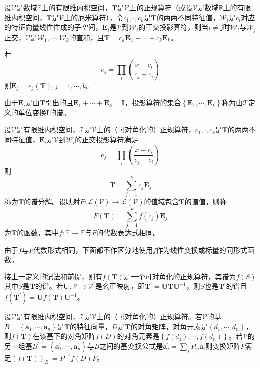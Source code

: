 \documentclass[main.tex]{subfiles}
\begin{document}
\begin{theorem}
设$\mathcal{V}$是数域$\mathbb{F}$上的有限维内积空间，$\mathbf{T}$是$\mathcal{V}$上的正规算符（或设$\mathcal{V}$是数域$\mathbb{R}$上的有限维内积空间，$\mathbf{T}$是$\mathcal{V}$上的厄米算符），令$c_1,\cdot,c_k$是$\mathbf{T}$的两两不同特征值，$\mathcal{W}_i$是$c_i$对应的特征向量线性性成的子空间，$\mathbf{E}_i$是$\mathcal{V}$到$\mathcal{W}_i$的正交投影算符，则当$i\neq j$时$\mathcal{W}_i$与$\mathcal{W}_j$正交，$\mathcal{V}$是$\mathcal{W}_1,\cdots,\mathcal{W}_k$的直和，且$\mathbf{T}=c_a\mathbf{E}_1+\cdots+c_k\mathbf{E}_k$。
\end{theorem}

\begin{corollary}
若
\[
e_j=\prod_i\left(\frac{x-c_i}{c_j-c_i}\right)\]
则$\mathbf{E}_j=e_j\left(\mathbf{T}\right),j=1,\cdots,k$。
\end{corollary}

由于$\mathbf{E}_i$是由$\mathbf{T}$引出的且$\mathbf{E}_1+\cdots+\mathbf{E}_k=\mathbf{I}$，投影算符的集合$\left\{\mathbf{E}_1,\cdots,\mathbf{E}_k\right\}$称为由$\mathcal{T}$定义的单位变换$\mathbf{I}$的谱。

\begin{definition}[谱分解]
设$\mathcal{V}$是有限维内积空间，$\mathcal{T}$是$\mathcal{V}$上的（可对角化的）正规算符，$c_1,\cdot,c_k$是$\mathbf{T}$的两两不同特征值，$\mathbf{E}_i$是$\mathcal{V}$到$\mathcal{W}_i$的正交投影算符满足\[
e_j=\prod_i\left(\frac{x-c_i}{c_j-c_i}\right)\]则
\[\mathbf{T}=\sum_{j=1}^kc_j\mathbf{E}_j\]
称为$\mathbf{T}$的谱分解。设映射$F:\mathcal{L}\left(\mathcal{V}\right)\rightarrow\mathcal{L}\left(\mathcal{V}\right)$的值域包含$\mathbf{T}$的谱值，则称
\[F\left(\mathbf{T}\right)=\sum_{j=1}^kf\left(c_j\right)\mathbf{E}_j\]
为$\mathbf{T}$的函数，其中$f:\mathbb{F}\rightarrow\mathbb{F}$与$F$的代数表达式相同。
\end{definition}

由于$f$与$F$代数形式相同，下面都不作区分地使用$f$作为线性变换或标量的同形式函数。

\begin{theorem}
接上一定义的记法和前提，则有$f\left(\mathbf{T}\right)$是一个可对角化的正规算符，其谱为$f\left(S\right)$其中$S$是$\mathbf{T}$的谱。若$\mathbf{U}:\mathcal{V}\rightarrow\mathcal{V}^\prime$是幺正映射，即$\mathbf{T}^\prime=\mathbf{UTU}^{-1}$，则$S$也是$\mathbf{T}^\prime$的谱且$f\left(\mathbf{T}^\prime\right)=\mathbf{U}f\left(\mathbf{T}\right)\mathbf{U}^{-1}$。
\end{theorem}

\begin{corollary}
设$\mathcal{V}$是有限维内积空间，$\mathcal{T}$是$\mathcal{V}$上的（可对角化的）正规算符。若$\mathcal{V}$的基$B=\left\{\mathbf{a}_1,\cdots,\mathbf{a}_n\right\}$是$\mathbf{T}$的特征向量，$D$是$\mathbf{T}$的对角矩阵，对角元素是$\left\{d_1,\cdots,d_n\right\}$，则$f\left(\mathbf{T}\right)$在该基下的对角矩阵$f\left(D\right)$的对角元素是$\left\{f\left(d_1\right),\cdots,f\left(d_n\right)\right\}$。若$\mathcal{V}$的另一组基$B^\prime=\left\{\mathbf{a}^\prime_1,\cdots,\mathbf{a}^\prime_n\right\}$与$B$之间的基变换公式是$\mathbf{a}^\prime_j=\sum_jP_{ij}\mathbf{a}_i$则变换矩阵$P$满足$\left(f\left(\mathbf{T}\right)\right)_{B^\prime}=P^{-1}f\left(D\right)P$。
\end{corollary}
\end{document}
